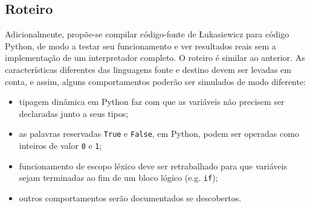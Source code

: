\documentclass{article}
\newenvironment{smallitem}{
    \vspace{-1mm}
    \begin{itemize}
    \setlength{\parskip}{0pt}
    \setlength{\itemsep}{2pt}
}{
    \vspace{-2mm}
    \end{itemize}
}
\begin{document}
\subsection{Roteiro}

Adicionalmente, propõe-se compilar código-fonte de Łukasiewicz para código
Python, de modo a testar seu funcionamento e ver resultados reais sem a
implementação de um interpretador completo. O roteiro é similar ao anterior. As
características diferentes das linguagens fonte e destino devem ser levadas em
conta, e assim, alguns comportamentos poderão ser simulados de modo diferente:

\begin{smallitem}
    \item tipagem dinâmica em Python faz com que as variáveis não precisem ser
        declaradas junto a seus tipos;
    \item as palavras reservadas \texttt{True} e \texttt{False}, em Python,
        podem ser operadas como inteiros de valor \texttt{0} e \texttt{1};
    \item funcionamento de escopo léxico deve ser retrabalhado para que
        variáveis sejam terminadas ao fim de um bloco lógico (e.g. \texttt{if});
    \item outros comportamentos serão documentados se descobertos.
\end{smallitem}
\end{document}
